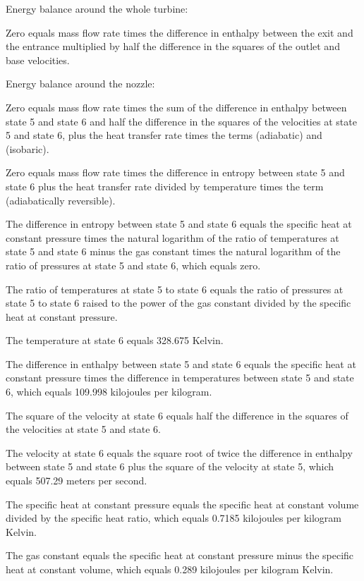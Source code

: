 Energy balance around the whole turbine:

Zero equals mass flow rate times the difference in enthalpy between the exit and the entrance multiplied by half the difference in the squares of the outlet and base velocities.

Energy balance around the nozzle:

Zero equals mass flow rate times the sum of the difference in enthalpy between state 5 and state 6 and half the difference in the squares of the velocities at state 5 and state 6, plus the heat transfer rate times the terms (adiabatic) and (isobaric).

Zero equals mass flow rate times the difference in entropy between state 5 and state 6 plus the heat transfer rate divided by temperature times the term (adiabatically reversible).

The difference in entropy between state 5 and state 6 equals the specific heat at constant pressure times the natural logarithm of the ratio of temperatures at state 5 and state 6 minus the gas constant times the natural logarithm of the ratio of pressures at state 5 and state 6, which equals zero.

The ratio of temperatures at state 5 to state 6 equals the ratio of pressures at state 5 to state 6 raised to the power of the gas constant divided by the specific heat at constant pressure.

The temperature at state 6 equals 328.675 Kelvin.

The difference in enthalpy between state 5 and state 6 equals the specific heat at constant pressure times the difference in temperatures between state 5 and state 6, which equals 109.998 kilojoules per kilogram.

The square of the velocity at state 6 equals half the difference in the squares of the velocities at state 5 and state 6.

The velocity at state 6 equals the square root of twice the difference in enthalpy between state 5 and state 6 plus the square of the velocity at state 5, which equals 507.29 meters per second.

The specific heat at constant pressure equals the specific heat at constant volume divided by the specific heat ratio, which equals 0.7185 kilojoules per kilogram Kelvin.

The gas constant equals the specific heat at constant pressure minus the specific heat at constant volume, which equals 0.289 kilojoules per kilogram Kelvin.